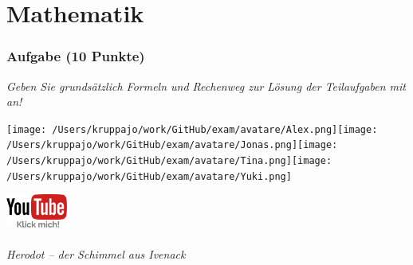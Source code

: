 \documentclass[a4paper, 9pt]{scrartcl}\usepackage[]{graphicx}\usepackage[]{xcolor}
\begin{document}
 
\clearpage
\part{Mathematik}

\section{Aufgabe \hfill (10 Punkte)}

\textit{Geben Sie grundsätzlich Formeln und Rechenweg zur Lösung der Teilaufgaben mit an!} \\[1Ex]
 

 
\ifcollection
\begin{flushright}
\tiny\vspace{-3Ex}
\textbf{\examinhaltstart}
\exammodulemathstat
\vspace{-4Ex}
\end{flushright}
\begin{minipage}[t]{0.5\textwidth}
\texttt{[image: /Users/kruppajo/work/GitHub/exam/avatare/Alex.png]}\hspace{-4mm}\texttt{[image: /Users/kruppajo/work/GitHub/exam/avatare/Jonas.png]}\hspace{-4mm}\texttt{[image: /Users/kruppajo/work/GitHub/exam/avatare/Tina.png]}\hspace{-4mm}\texttt{[image: /Users/kruppajo/work/GitHub/exam/avatare/Yuki.png]}
\end{minipage}
\begin{minipage}[t]{0.5\textwidth}
\hfill
\href{https://youtu.be/Fu8kN0Uj13Y}{\includegraphics[width = 2cm]{img/youtube}}
\end{minipage}
\fi



\ifcollection
\paragraph{Herodot – der Schimmel aus Ivenack}
\fi
\end{document}
